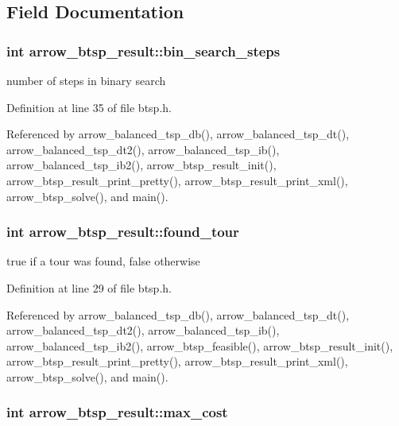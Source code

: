 \subsection{Field Documentation}
\hypertarget{structarrow__btsp__result_80106c5f0b8f82353ad6771ad9eaac71}{
\subsubsection[{bin\_\-search\_\-steps}]{\setlength{\rightskip}{0pt plus 5cm}int {\bf arrow\_\-btsp\_\-result::bin\_\-search\_\-steps}}}
\label{structarrow__btsp__result_80106c5f0b8f82353ad6771ad9eaac71}


number of steps in binary search 

Definition at line 35 of file btsp.h.

Referenced by arrow\_\-balanced\_\-tsp\_\-db(), arrow\_\-balanced\_\-tsp\_\-dt(), arrow\_\-balanced\_\-tsp\_\-dt2(), arrow\_\-balanced\_\-tsp\_\-ib(), arrow\_\-balanced\_\-tsp\_\-ib2(), arrow\_\-btsp\_\-result\_\-init(), arrow\_\-btsp\_\-result\_\-print\_\-pretty(), arrow\_\-btsp\_\-result\_\-print\_\-xml(), arrow\_\-btsp\_\-solve(), and main().\hypertarget{structarrow__btsp__result_6ba21b4231cfe2c1e437a9f7e8f31aa6}{
\subsubsection[{found\_\-tour}]{\setlength{\rightskip}{0pt plus 5cm}int {\bf arrow\_\-btsp\_\-result::found\_\-tour}}}
\label{structarrow__btsp__result_6ba21b4231cfe2c1e437a9f7e8f31aa6}


true if a tour was found, false otherwise 

Definition at line 29 of file btsp.h.

Referenced by arrow\_\-balanced\_\-tsp\_\-db(), arrow\_\-balanced\_\-tsp\_\-dt(), arrow\_\-balanced\_\-tsp\_\-dt2(), arrow\_\-balanced\_\-tsp\_\-ib(), arrow\_\-balanced\_\-tsp\_\-ib2(), arrow\_\-btsp\_\-feasible(), arrow\_\-btsp\_\-result\_\-init(), arrow\_\-btsp\_\-result\_\-print\_\-pretty(), arrow\_\-btsp\_\-result\_\-print\_\-xml(), arrow\_\-btsp\_\-solve(), and main().\hypertarget{structarrow__btsp__result_06f661dc0e63cb5fd1888303b3ec626f}{
\subsubsection[{max\_\-cost}]{\setlength{\rightskip}{0pt plus 5cm}int {\bf arrow\_\-btsp\_\-result::max\_\-cost}}}
\label{structarrow__btsp__result_06f661dc0e63cb5fd1888303b3ec626f}


